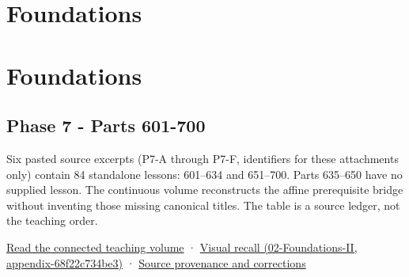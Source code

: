 \hypertarget{appendix-fd090d982a15}{}
\section*{Foundations}
\section{Foundations}\label{appendix-fd090d982a15-foundations}

\subsection{Phase 7 - Parts 601-700}\label{appendix-fd090d982a15-phase-7---parts-601-700}

Six pasted source excerpts (P7-A through P7-F, identifiers for these attachments only) contain 84 standalone lessons: 601--634 and 651--700. Parts 635--650 have no supplied lesson. The continuous volume reconstructs the affine prerequisite bridge without inventing those missing canonical titles. The table is a source ledger, not the teaching order.

\hyperref[01-foundations-i-ch018-keep-the-promises-visible-while-moving-between-representations]{Read the connected teaching volume} · \href{../02-Foundations-II/main.pdf\#nameddest=appendix-68f22c734be3}{Visual recall (02-Foundations-II, appendix-68f22c734be3)} · \hyperref[appendix-a103e7846d21-phase-7---source-analysis-and-verification]{Source provenance and corrections}

